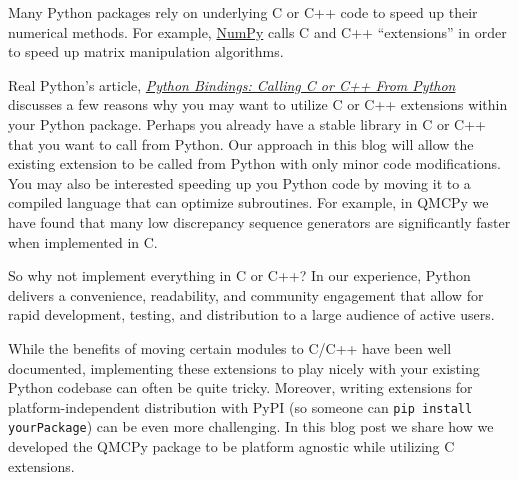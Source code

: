  


 


Many Python packages rely on underlying C or C++ code to speed up their numerical methods. For example, \href{https://numpy.org/}{NumPy} calls C and C++ ``extensions'' in order to speed up matrix manipulation algorithms. 

Real Python's article, \href{https://realpython.com/python-bindings-overview/#python-bindings-overview}{\emph{Python Bindings: Calling C or C++ From Python}} discusses a few reasons why you may want to utilize C or C++ extensions within your Python package. Perhaps you already have a stable library in C or C++ that you want to call from Python. Our approach in this blog will allow the existing extension to be called from Python with only minor code modifications.  You may also be interested speeding up you Python code by moving it to a compiled language that can optimize subroutines. For example, in QMCPy we have found that many low discrepancy sequence generators are significantly faster when implemented in C.  

So why not implement everything in C or C++? In our experience, Python delivers a convenience, readability, and community engagement that allow for rapid development, testing, and distribution to a large audience of active users. 

While the benefits of moving certain  modules to C/C++ have been well documented, implementing these extensions to play nicely with your existing Python codebase can often be quite tricky. Moreover, writing extensions for platform-independent distribution with PyPI (so someone can \texttt{pip install yourPackage}) can be even more challenging. In this blog post we share how we developed the QMCPy package \cite{QMCPy2020a} to be platform agnostic while utilizing C extensions.

